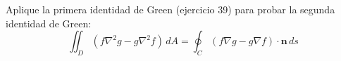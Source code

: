 \item Aplique la primera identidad de Green (ejercicio 39) para probar la segunda identidad de Green:
    \[ \iint_D (f \nabla^2 g - g \nabla^2 f) \, dA = \oint_C (f \nabla g - g \nabla f) \cdot \mathbf{n} \, ds \]
